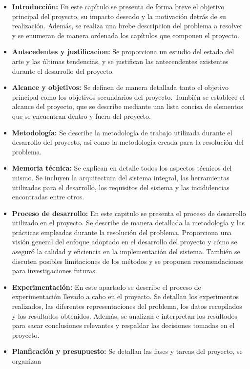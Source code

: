 \begin{itemize}
    \item \textbf{Introducción:} En este capítulo se presenta de forma breve el objetivo 
    principal del proyecto, su impacto deseado y la motivación detrás de su realización. 
    Además, se realiza una brebe descripcion del problema a resolver y se enumeran de manera 
    ordenada los capítulos que componen el proyecto.
    \item \textbf{Antecedentes y justificacion:} Se proporciona un estudio del estado del 
    arte y las últimas tendencias, y se justifican las antecendentes existentes durante el 
    desarrollo del proyecto.
    \item \textbf{Alcance y objetivos:} Se definen de manera detallada tanto el objetivo 
    principal como los objetivos secundarios del proyecto. También se establece el alcance 
    del proyecto, que se describe mediante una lista concisa de elementos que se encuentran 
    dentro y fuera del proyecto.
    \item \textbf{Metodología:} Se describe la metodología de trabajo utilizada durante el
    desarrollo del proyecto, asi como la metodología creada para la resolución del problema.
    \item \textbf{Memoria técnica:} Se explican en detalle todos los aspectos técnicos del mismo. 
    Se incluyen la arquitectura del sistema integral, las herramientas utilizadas para el desarrollo, 
    los requisitos del sistema y las incididencias encontradas entre otros.
    \item \textbf{Proceso de desarrollo:} En este capitulo se presenta el proceso de desarrollo 
    utilizado en el proyecto. Se describe de manera detallada la metodología y las prácticas 
    empleadas durante la resolución del problema. Proporciona una visión general del enfoque 
    adoptado en el desarrollo del proyecto y cómo se aseguró la calidad y eficiencia en la 
    implementación del sistema. También se discuten posibles limitaciones de los métodos 
    y se proponen recomendaciones para investigaciones futuras.
    \item \textbf{Experimentación:} En este apartado se describe el proceso de experimentación 
    llevado a cabo en el proyecto. Se detallan los experimentos realizados, las diferentes
    representaciones del problema, los datos recopilados y los resultados obtenidos. Además, 
    se analizan e interpretan los resultados para sacar conclusiones relevantes y respaldar 
    las decisiones tomadas en el proyecto.  
    \item \textbf{Planficación y presupuesto:} Se detallan las fases y tareas del proyecto, se organizan 

\end{itemize}
